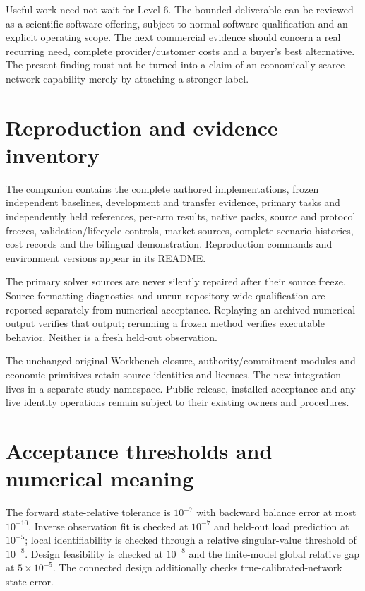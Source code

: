 \documentclass[11pt,letterpaper]{article}
\begin{document}
Useful work need not wait for Level 6. The bounded deliverable can be reviewed as a scientific-software offering, subject to normal software qualification and an explicit operating scope. The next commercial evidence should concern a real recurring need, complete provider/customer costs and a buyer's best alternative. The present finding must not be turned into a claim of an economically scarce network capability merely by attaching a stronger label.

\appendix
\section{Reproduction and evidence inventory}

The companion contains the complete authored implementations, frozen independent baselines, development and transfer evidence, primary tasks and independently held references, per-arm results, native packs, source and protocol freezes, validation/lifecycle controls, market sources, complete scenario histories, cost records and the bilingual demonstration. Reproduction commands and environment versions appear in its README.

The primary solver sources are never silently repaired after their source freeze. Source-formatting diagnostics and unrun repository-wide qualification are reported separately from numerical acceptance. Replaying an archived numerical output verifies that output; rerunning a frozen method verifies executable behavior. Neither is a fresh held-out observation.

The unchanged original Workbench closure, authority/commitment modules and economic primitives retain source identities and licenses. The new integration lives in a separate study namespace. Public release, installed acceptance and any live identity operations remain subject to their existing owners and procedures.

\section{Acceptance thresholds and numerical meaning}

The forward state-relative tolerance is $10^{-7}$ with backward balance error at most $10^{-10}$. Inverse observation fit is checked at $10^{-7}$ and held-out load prediction at $10^{-5}$; local identifiability is checked through a relative singular-value threshold of $10^{-8}$. Design feasibility is checked at $10^{-8}$ and the finite-model global relative gap at $5\times10^{-5}$. The connected design additionally checks true-calibrated-network state error.
\end{document}
